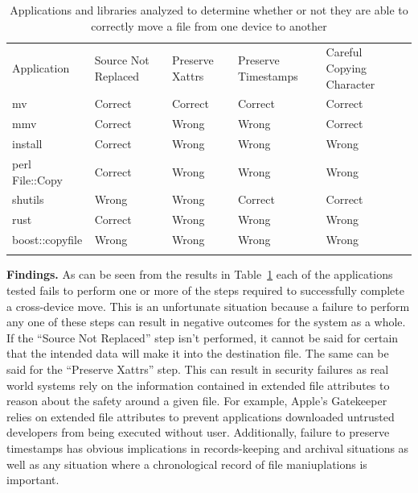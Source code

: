 \begin{table}[t]
    \scriptsize{}
    \begin{tabular}{l l l l l}
    \toprule{}
        Application     & Source Not Replaced & Preserve Xattrs & Preserve Timestamps & Careful Copying Character\\
        mv              & Correct             & Correct         & Correct             & Correct\\
        mmv             & Correct             & Wrong           & Wrong               & Correct\\
        install         & Correct             & Wrong           & Wrong               & Wrong\\
        perl File::Copy & Correct             & Wrong           & Wrong               & Wrong\\
        shutils         & Wrong               & Wrong           & Correct             & Correct\\
        rust            & Correct             & Wrong           & Wrong               & Wrong\\
        boost::copyfile & Wrong               & Wrong           & Wrong               & Wrong\\
    \bottomrule{}
    \end{tabular}
    \caption{Applications and libraries analyzed to determine whether or not
      they are able to correctly move a file from one device to another}
    \label{table:crossdevice}
\end{table}

{\bf Findings.}
As can be seen from the results in Table~\ref{table:crossdevice} each of the
applications tested fails to perform one or more of the steps required to
successfully complete a cross-device move.  This is an unfortunate situation
because a failure to perform any one of these steps can result in negative
outcomes for the system as a whole.  If the ``Source Not Replaced'' step isn't
performed, it cannot be said for certain that the intended data will make it
into the destination file.  The same can be said for the ``Preserve Xattrs''
step.  This can result in security failures as real world systems rely on the
information contained in extended file attributes to reason about the safety
around a given file.  For example, Apple's Gatekeeper relies on extended file
attributes to prevent applications downloaded untrusted developers from being
executed without user.  Additionally, failure to preserve timestamps has obvious
implications in records-keeping and archival situations as well as any situation
where a chronological record of file maniuplations is important.

